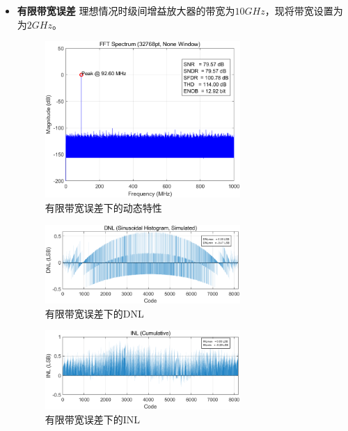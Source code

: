 \documentclass[cs4size,a4paper]{ctexart}
\numberwithin{equation}{section}
\numberwithin{table}{section}
\numberwithin{figure}{section}
\begin{document}
\begin{itemize}
		\item \textbf{有限带宽误差} 理想情况时级间增益放大器的带宽为$10GHz$，现将带宽设置为为$2GHz$。
		\begin{figure}[H]
			\centering
			\includegraphics[width=0.7\textwidth]{pic/GBW/DFT.png}
			\caption{有限带宽误差下的动态特性} 
		\end{figure}

		\begin{figure}[H]
			\centering
			\includegraphics[width=0.7\textwidth]{pic/GBW/DNL.png}
			\caption{有限带宽误差下的DNL} 
		\end{figure}

		\begin{figure}[H]
			\centering
			\includegraphics[width=0.7\textwidth]{pic/GBW/INL.png}
			\caption{有限带宽误差下的INL} 
		\end{figure}


\end{itemize}
\end{document}
